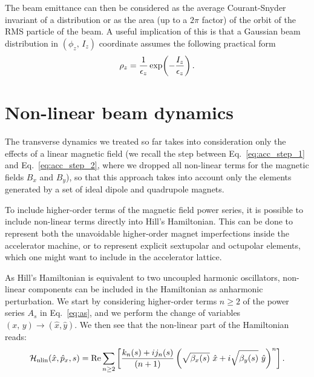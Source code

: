 The beam emittance can then be considered as the average Courant-Snyder invariant of a distribution or as the area (up to a $2\pi$ factor) of the orbit of the RMS particle of the beam. A useful implication of this is that a Gaussian beam distribution in $(\phi_z,\,I_z)$ coordinate assumes the following practical form
%
\begin{equation}
\rho_z = \frac{1}{\epsilon_z}\exp(-\frac{I_z}{\epsilon_z})\,.
\end{equation}
%

\section{Non-linear beam dynamics}\label{sec:non-linear}

The transverse dynamics we treated so far takes into consideration only the effects of a linear magnetic field (we recall the step between Eq.~\eqref{eq:acc_step_1} and Eq.~\eqref{eq:acc_step_2}, where we dropped all non-linear terms for the magnetic fields $B_x$ and $B_y$), so that this approach takes into account only the elements generated by a set of ideal dipole and quadrupole magnets.

To include higher-order terms of the magnetic field power series, it is possible to include non-linear terms directly into Hill's Hamiltonian. This can be done to represent both the unavoidable higher-order magnet imperfections inside the accelerator machine, or to represent explicit sextupolar and octupolar elements, which one might want to include in the accelerator lattice. 

As Hill's Hamiltonian is equivalent to two uncoupled harmonic oscillators, non-linear components can be included in the Hamiltonian as anharmonic perturbation. We start by considering higher-order terms $n \ge 2$ of the power series $A_s$ in Eq.~\eqref{eq:as}, and we perform the change of variables $(x,\,y) \to (\hat x, \hat y)$. We then see that the non-linear part of the Hamiltonian reads:
%
\begin{equation}
    \mathcal{H}_\text{nlin}(\hat x, \hat p_x, s) = \Re \sum_{n\ge 2} \qty[\frac{k_n(s) + ij_n(s)}{(n+1)} \left(\sqrt{\beta_x(s)}\ \hat x + i\sqrt{\beta_y(s)}\ \hat y\right)^n]\,.
\end{equation}  

